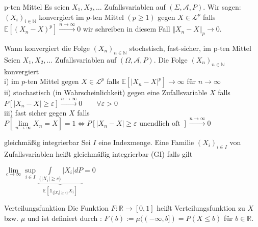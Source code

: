 \documentclass[avery5371,grid,frame]{flashcards} %
\newcommand{\E}{\mathbb{E}}
\newcommand{\N}{\mathbb{N}}
\newcommand{\R}{\mathbb{R}}
\newcommand{\1}{ \mathbb{1} } %
\begin{document}
\begin{flashcard}{p-ten Mittel}
  Es seien $X_1,X_2,\ldots$ Zufallsvariablen auf $(\Sigma,\mathcal{A},P)$. Wir
  sagen: \\
    $(X_i)_{i \in \mathbb{N}}$ konvergiert im $p$-ten Mittel
    $(p\geq 1)$ gegen $X \in \mathcal{L}^p$ falls
      $\mathbb{E}[(X_n-X)^p] \overset{n \to \infty}{\to}0$
    wir schreiben in diesem Fall $\Vert X_n-X\Vert_p \to 0$.\\
\end{flashcard}
\begin{flashcard}[Definition]{Wann konvergiert die Folge $(X_n)_{n \in \N}$ stochstisch, fast-sicher, im p-ten Mittel}
  Seien $X_1,X_2,\ldots$ Zufallsvariablen auf $(\Omega,\mathcal{A},P)$. Die Folge
  $(X_n)_{n \in \N}$ konvergiert \\
  i) im $p$-ten Mittel gegen $X \in \mathcal{L}^p$ falls
      $\E[|X_n-X|^p] \to \infty$ für $n \to \infty$ \\
  ii) stochastisch (in Wahrscheinlichkeit) gegen eine Zufallsvariable $X$
    falls
      $P[|X_n-X|\geq \varepsilon ] \overset{n \to \infty}{\to} 0\qquad
      \forall \varepsilon >0$ \\
  iii) fast sicher gegen $X$ falls $P[\lim\limits_{n \to \infty}X_n=X ]=1 \iff P[|X_n-X|\geq \varepsilon \text{ unendlich oft }] \overset{n \to \infty}{\to} 0$
\end{flashcard}

\begin{flashcard}[Definition]{gleichmäßig integrierbar}
  Sei $I$ eine Indexmenge. Eine Familie $(X_i)_{i \in I}$ von Zufallsvariablen
  heißt gleichmäßig integrierbar (GI) falls gilt
  \begin{center}
    $\lim\limits_{c \to \infty} \sup\limits_{i \in I}
    \underbrace{\int\limits_{\{|X_i|\geq
        c\}}|X_i|dP}_{\E[\1_{\{|X_i|\geq c\}}X_i]}=0 $
  \end{center}
\end{flashcard}

\begin{flashcard}[Definition]{Verteilungsfunktion}
  Die Funktion $F:\R \to [0,1]$ heißt Verteilungsfunktion zu $X$ bzw. $\mu$ und ist definiert durch : $F(b):=\mu((-\infty,b])=P(X\leq b)$ für $b \in \R$.
\end{flashcard}
\end{document}
